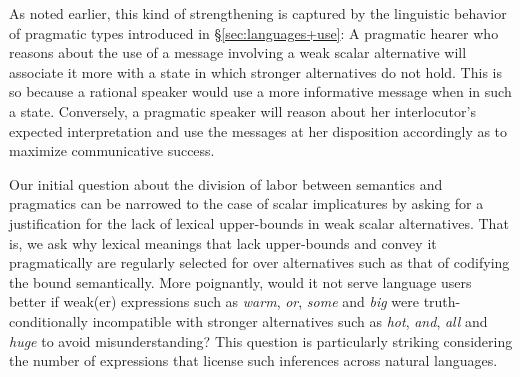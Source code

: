 \documentclass[a4paper]{article}
\begin{document}
As noted earlier, this kind of strengthening is captured by the linguistic behavior of pragmatic types introduced in \S\ref{sec:languages+use}: A pragmatic hearer who reasons about the use of a message involving a weak scalar alternative will associate it more with a state in which stronger alternatives do not hold. This is so because a rational speaker would use a more informative message when in such a state. Conversely, a pragmatic speaker will reason about her interlocutor's expected interpretation and use the messages at her disposition accordingly as to maximize communicative success.

Our initial question about the division of labor between semantics and pragmatics can be narrowed to the case of scalar implicatures by asking for a justification for the lack of lexical upper-bounds in weak scalar alternatives. That is, we ask why lexical meanings that lack upper-bounds and convey it pragmatically are regularly selected for over alternatives such as that of codifying the bound semantically. More poignantly, would it not serve language users better if weak(er) expressions such as {\em warm}, {\em or}, {\em some} and {\em big} were truth-conditionally incompatible with stronger alternatives such as {\em hot}, {\em and}, {\em all} and {\em huge} to avoid misunderstanding?  This question is particularly striking considering the number of expressions that license such inferences across natural languages. 
\end{document}
